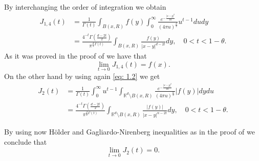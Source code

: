 \documentclass[10pt, a4paper, reqno]{amsart}
\theoremstyle{definition}
\theoremstyle{remark}
\numberwithin{equation}{section}
\begin{document}
By interchanging the order of integration we obtain
\begin{align*}
    J_{1,4}(t) &=\frac{1}{\Gamma(t)}\int_{B(x,R)}f(y)\int_0^\infty\frac{e^{-\frac{|x-y|^2}{4u}}}{(4\pi u)^{\frac{d}{2}}}u^{t-1}du dy\\
    &= \frac{4^{-t}\Gamma\left(\frac{d-2t}{2}\right)}{\pi^{\frac{d}{2}\Gamma(t)}}\int_{B(x,R)}\frac{f(y)}{|x-y|^{d-2t}}dy,\quad 0<t<1-\theta.
\end{align*}
As it was proved in the proof of \cite[Proposition 2.3]{ChV1} we have that
\[
\lim_{t \rightarrow 0} J_{1,4}(t) = f(x).
\]
On the other hand by using again \eqref{eq: 1.2} we get
\begin{align*}
    J_{2}(t) &=\frac{1}{\Gamma(t)}\int_0^\infty u^{t-1}\int_{\mathbb R^d\setminus B(x,R)}\frac{e^{-\frac{|x-y|^2}{4u}}}{(4\pi u)^{\frac{n}{2}}}|f(y)|dy du\\ 
    &= \frac{4^{-t}\Gamma\left(\frac{d-2t}{2}\right)}{\pi^{\frac{d}{2}\Gamma(t)}}\int_{\mathbb R^d \setminus B(x,R)}\frac{|f(y)|}{|x-y|^{n-2t}}dy,\quad 0<t<1-\theta.
\end{align*}

By using now H\"older and Gagliardo-Nirenberg inequalities as in the proof of \cite[Proposition 2.3]{ChV1} we conclude that
\[
\lim_{t \rightarrow 0} J_2(t)=0.
\]




\end{document}
